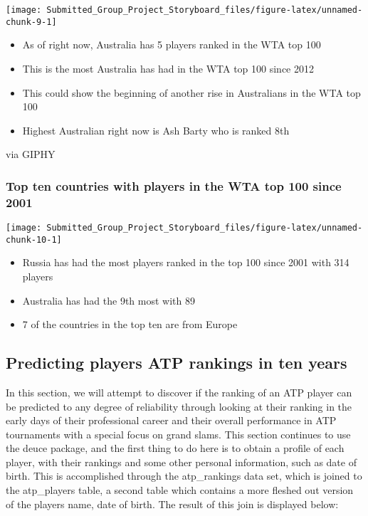 \documentclass[]{article}
\providecommand{\tightlist}{%
  \setlength{\itemsep}{0pt}\setlength{\parskip}{0pt}}
\begin{document}
\begin{center}\texttt{[image: Submitted\_Group\_Project\_Storyboard\_files/figure-latex/unnamed-chunk-9-1]} \end{center}

\begin{itemize}
\tightlist
\item
  As of right now, Australia has 5 players ranked in the WTA top 100
\item
  This is the most Australia has had in the WTA top 100 since 2012
\item
  This could show the beginning of another rise in Australians in the
  WTA top 100
\item
  Highest Australian right now is Ash Barty who is ranked 8th
\end{itemize}

via GIPHY

\subsubsection{Top ten countries with players in the WTA top 100 since
2001}\label{top-ten-countries-with-players-in-the-wta-top-100-since-2001}

\begin{center}\texttt{[image: Submitted\_Group\_Project\_Storyboard\_files/figure-latex/unnamed-chunk-10-1]} \end{center}

\begin{itemize}
\tightlist
\item
  Russia has had the most players ranked in the top 100 since 2001 with
  314 players
\item
  Australia has had the 9th most with 89
\item
  7 of the countries in the top ten are from Europe
\end{itemize}

\subsection{Predicting players ATP rankings in ten
years}\label{predicting-players-atp-rankings-in-ten-years}

In this section, we will attempt to discover if the ranking of an ATP
player can be predicted to any degree of reliability through looking at
their ranking in the early days of their professional career and their
overall performance in ATP tournaments with a special focus on grand
slams. This section continues to use the deuce package, and the first
thing to do here is to obtain a profile of each player, with their
rankings and some other personal information, such as date of birth.
This is accomplished through the atp\_rankings data set, which is joined
to the atp\_players table, a second table which contains a more fleshed
out version of the players name, date of birth. The result of this join
is displayed below:
\end{document}

